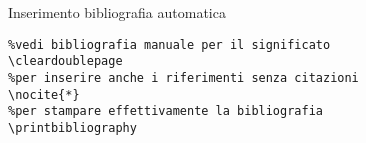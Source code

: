 \begin{frame}[fragile]{Inserimento bibliografia automatica}

\begin{lstlisting}
%vedi bibliografia manuale per il significato
\cleardoublepage
%per inserire anche i riferimenti senza citazioni
\nocite{*}
%per stampare effettivamente la bibliografia
\printbibliography
\end{lstlisting}

\end{frame}